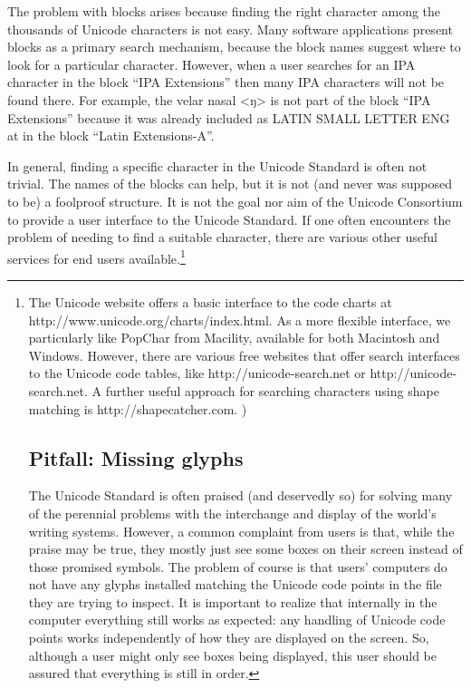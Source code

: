 {{{{{{{{{{{{{{{{The problem with blocks arises because finding the right character among the thousands of Unicode characters is not easy. Many software applications present blocks as a primary search mechanism, because the block names suggest where to look for a particular character. However, when a user searches for an IPA character in the block ``IPA Extensions'' then many IPA characters will not be found there. For example, the velar nasal <ŋ> is not part of the block ``IPA Extensions'' because it was already included as LATIN SMALL LETTER ENG at  in the block ``Latin Extensions-A''.

In general, finding a specific character in the Unicode Standard is often not trivial. The names of the blocks can help, but it is not (and never was supposed to be) a foolproof structure. It is not the goal nor aim of the Unicode Consortium to provide a user interface to the Unicode Standard. If one often encounters the problem of needing to find a suitable character, there are various other useful services for end users available.\footnote{The Unicode website offers a basic interface to the code charts at http://www.unicode.org/charts/index.html. As a more flexible interface, we particularly like PopChar from Macility, available for both Macintosh and Windows. However, there are various free websites that offer search interfaces to the Unicode code tables, like http://unicode-search.net or http://unicode-search.net. A further useful approach for searching characters using shape matching is http://shapecatcher.com. )

\subsection{Pitfall: Missing glyphs}\label{pitfall-missing-glyphs}

The Unicode Standard is often praised (and deservedly so) for solving many of the perennial problems with the interchange and display of the world's writing systems. However, a common complaint from users is that, while the praise may be true, they mostly just see some boxes on their screen instead of those promised symbols. The problem of course is that users' computers do not have any glyphs installed matching the Unicode code points in the file they are trying to inspect. It is important to realize that internally in the computer everything still works as expected: any handling of Unicode code points works independently of how they are displayed on the screen. So, although a user might only see boxes being displayed, this user should be assured that everything is still in order.

}}}}}}}}}}}}}}}}}
